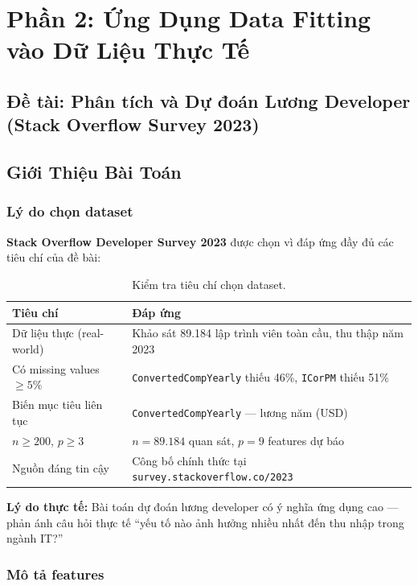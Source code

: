 \section{Phần 2: Ứng Dụng Data Fitting vào Dữ Liệu Thực Tế}
\subsection*{Đề tài: Phân tích và Dự đoán Lương Developer (Stack Overflow Survey 2023)}

\subsection{Giới Thiệu Bài Toán}

\subsubsection{Lý do chọn dataset}

\textbf{Stack Overflow Developer Survey 2023} được chọn vì đáp ứng đầy đủ
các tiêu chí của đề bài:

\begin{table}[H]
\centering
\begin{tabular}{lp{9cm}}
\toprule
\textbf{Tiêu chí} & \textbf{Đáp ứng} \\
\midrule
Dữ liệu thực (real-world) & Khảo sát 89.184 lập trình viên toàn cầu, thu thập năm 2023 \\
Có missing values $\geq 5\%$ & \texttt{ConvertedCompYearly} thiếu 46\%, \texttt{ICorPM} thiếu 51\% \\
Biến mục tiêu liên tục & \texttt{ConvertedCompYearly} — lương năm (USD) \\
$n \geq 200$, $p \geq 3$ & $n = 89.184$ quan sát, $p = 9$ features dự báo \\
Nguồn đáng tin cậy & Công bố chính thức tại \texttt{survey.stackoverflow.co/2023} \\
\bottomrule
\end{tabular}
\caption{Kiểm tra tiêu chí chọn dataset.}
\end{table}

\noindent\textbf{Lý do thực tế:} Bài toán dự đoán lương developer có ý nghĩa ứng dụng
cao — phản ánh câu hỏi thực tế ``yếu tố nào ảnh hưởng nhiều nhất đến thu nhập trong
ngành IT?''

\subsubsection{Mô tả features}

